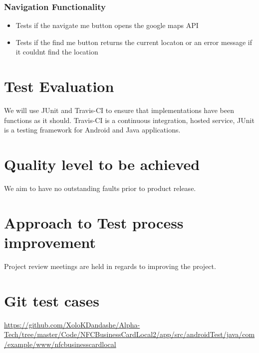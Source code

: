 \documentclass[english]{article}
\begin{document}
		\subsubsection{Navigation Functionality}
		\begin{itemize}
			\item Tests if the navigate me button opens the google maps API
			\item Tests if the find me button returns the current locaton or an error message if it couldnt find the location
\\
					\href{url}{}
		\end{itemize}
		
			
	
		

	\section{Test Evaluation}
	
	We will use JUnit and  Travis-CI to ensure that implementations have been functions as it should.
	Travis-CI is a continuous integration, hosted service,  JUnit is a testing framework for Android and Java applications.
	\section{Quality level to be achieved}
	We aim to have no outstanding faults prior to product release.
	
	\section{Approach to Test process improvement}
	
	Project review meetings are held in regards to improving the project.
	
	
	 
	\section{Git test cases  }

					\href{url}{https://github.com/XoloKDandashe/Alpha-Tech/tree/master/Code/NFCBusinessCardLocal2/app/src/androidTest/java/com/example/www/nfcbusinesscardlocal}
\end{document}
